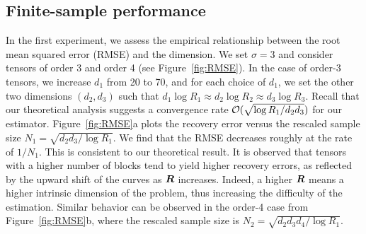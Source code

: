 \documentclass{article}
\begin{document}

\subsection{Finite-sample performance}



In the first experiment, we assess the empirical relationship between the root mean squared error (RMSE) and the dimension. We set $\sigma=3$ and consider tensors of order 3 and order 4 (see Figure~\ref{fig:RMSE}). In the case of order-3 tensors, we increase $d_1$ from 20 to 70, and for each choice of $d_1$, we set the other two dimensions $(d_2,d_3)$ such that $d_1\log R_1\approx d_2\log R_2\approx d_3\log R_3$. Recall that our theoretical analysis suggests a convergence rate $\mathcal{O}(\sqrt{\log R_1/d_2d_3})$ for our estimator. Figure~\ref{fig:RMSE}a plots the recovery error versus the rescaled sample size $N_1=\sqrt{d_2d_3/\log R_1}$. We find that the RMSE decreases roughly at the rate of $1/N_1$. This is consistent to our theoretical result. It is observed that tensors with a higher number of blocks tend to yield higher recovery errors, as reflected by the upward shift of the curves as $\bm{R}$ increases. Indeed, a higher $\bm{R}$ means a higher intrinsic dimension of the problem, thus increasing the difficulty of the estimation. Similar behavior can be observed in the order-4 case from Figure~\ref{fig:RMSE}b, where the rescaled sample size is $N_2 = \sqrt{d_2d_3d_4/\log R_1}$.
\end{document}

